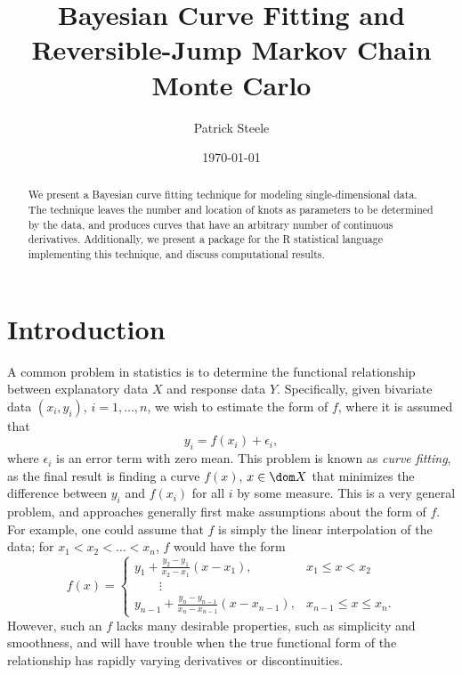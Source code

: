 \documentclass[12pt]{article}
\title{Bayesian Curve Fitting and Reversible-Jump Markov Chain Monte
  Carlo}
\author{Patrick Steele}
\date{\today}
\begin{document}
\maketitle

\begin{abstract}
  We present a Bayesian curve fitting technique for modeling
  single-dimensional data. The technique leaves the number and
  location of knots as parameters to be determined by the data, and
  produces curves that have an arbitrary number of continuous
  derivatives. Additionally, we present a package for the R
  statistical language implementing this technique, and discuss
  computational results.
\end{abstract}

\section{Introduction}

A common problem in statistics is to determine the functional
relationship between explanatory data $X$ and response data
$Y$. Specifically, given bivariate data $(x_i, y_i)$, $i = 1, \ldots,
n$, we wish to estimate the form of $f$, where it is assumed that
\begin{equation*}
  y_i = f(x_i) + \epsilon_i,
\end{equation*}
where $\epsilon_i$ is an error term with zero mean. This problem is
known as \textit{curve fitting}, as the final result is finding a
curve $f(x)$, $x \in \dom X$ that minimizes the difference between
$y_i$ and $f(x_i)$ for all $i$ by some measure. This is a very general
problem, and approaches generally first make assumptions about the
form of $f$. For example, one could assume that $f$ is simply the
linear interpolation of the data; for $x_1 < x_2 < \ldots < x_n$, $f$
would have the form
\begin{equation*}
  f(x) = 
  \begin{cases}
    y_1 + \frac{y_2 - y_1}{x_2 - x_1} (x - x_1), & x_1 \le x < x_2 \\
    \qquad \vdots \\
    y_{n - 1} + \frac{y_n - y_{n - 1}}{x_n - x_{n - 1}} (x - x_{n -
      1}), & x_{n - 1} \le x \le x_n.
  \end{cases}
\end{equation*}
However, such an $f$ lacks many desirable properties, such as
simplicity and smoothness, and will have trouble when the true
functional form of the relationship has rapidly varying derivatives or
discontinuities.
\end{document}
